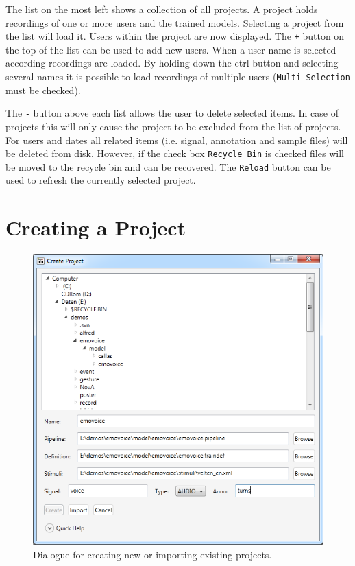 The list on the most left shows a collection of all projects. A project holds recordings of one or more users and the trained models. Selecting a project from the list will load it. Users within the project are now displayed. The \texttt{+} button on the top of the list can be used to add new users. When a user name is selected according recordings are loaded. By holding down the ctrl-button and selecting several names it is possible to load recordings of multiple users (\texttt{Multi Selection} must be checked).

The \texttt{-} button above each list allows the user to delete selected items. In case of projects this will only cause the project to be excluded from the list of projects. For users and dates all related items (i.e. signal, annotation and sample files) will be deleted from disk. However, if the check box \texttt{Recycle Bin} is checked files will be moved to the recycle bin and can be recovered. The \texttt{Reload} button can be used to refresh the currently selected project.

\section{Creating a Project}\label{lab:project_create}

\begin{figure}[h]
\begin{center}
\includegraphics[scale=0.5]{pics/project_new.png}
\end{center}
\vspace{-0.5cm}
\caption{Dialogue for creating new or importing existing projects.}
\label{fig:project_new}
\end{figure}

